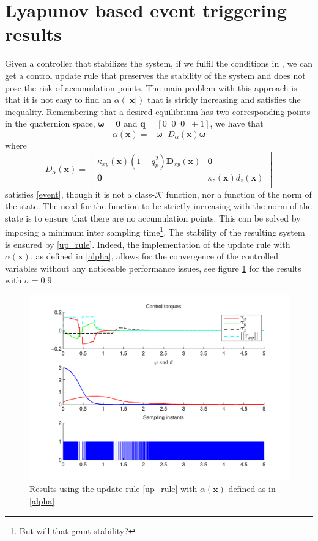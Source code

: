 \documentclass{article}
\begin{document}
	\section{Lyapunov based event triggering results}
		Given a controller that stabilizes the system, if we fulfil the conditions in \cite[Theorem~3.1]{tabuada_event_control}, we can get a control update rule that preserves the stability of the system and does not pose the risk of accumulation points. The main problem with this approach is that it is not easy to find an $\alpha{(|\mathbf{x}|)}$ that is stricly increasing and satisfies the inequality. Remembering that a desired equilibrium has two corresponding points in the quaternion space, $\boldsymbol \omega = \mathbf{0}$ and $\mathbf{q} = \left [0 \;\; 0 \;\; 0 \;\; \pm 1 \right ]$, we have that 
		\begin{equation}
			\alpha(\mathbf{x}) = -\boldsymbol \omega^\top D_\alpha(\mathbf{x}) \boldsymbol \omega
			\label{alpha}
		\end{equation}
		where
		\[
			D_\alpha(\mathbf{x}) = \begin{bmatrix}
									\kappa_{xy}(\mathbf{x}) (1-q_p^2)\mathbf{D}_{xy}(\mathbf{x}) &	\mathbf{0} \\
									\mathbf{0}	&	\kappa_z(\mathbf{x})d_z(\mathbf{x})\\
								  \end{bmatrix}
		\]
		satisfies \eqref{event}, though it is not a class-$\mathcal{K}$ function, nor a function of the norm of the state. The need for the function to be strictly increasing with the norm of the state is to ensure that there are no accumulation points. This can be solved by imposing a minimum inter sampling time\footnote{But will that grant stability?}. The stability of the resulting system is ensured by \eqref{up_rule}. Indeed, the implementation of the update rule with $\alpha(\mathbf{x})$, as defined in \eqref{alpha}, allows for the convergence of the controlled variables without any noticeable performance issues, see figure \ref{event_results1} for the results with $\sigma = 0.9$.
		\begin{figure}[ht]
			\centering
			\includegraphics[width=\textwidth]{event_1}
			\caption{Results using the update rule \eqref{up_rule} with $\alpha(\mathbf{x})$ defined as in \eqref{alpha} \label{event_results1}}
		\end{figure}
		
\end{document}
